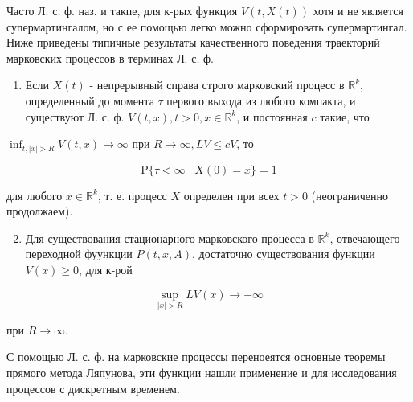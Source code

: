 \documentclass[10pt]{article}
\begin{document}
Часто Л. с. ф. наз. и такпе, для к-рых функция $V(t, X(t))$ хотя и не является супермартингалом, но с ее помощью легко можно сформировать супермартингал. Ниже приведены типичные результаты качественного поведения траекторий марковских процессов в терминах Л. с. ф.



\begin{enumerate}

  \item Если $X(t)$ - непрерывный справа строго марковский процесс в $\mathbb{R}^{k}$, определенный до момента $\tau$ первого выхода из любого компакта, и существуют Л. с. ф. $V(t, x), t>0, x \in \mathbb{R}^{k}$, и постоянная $c$ такие, что

\end{enumerate}



$\inf _{t,|x|>R} V(t, x) \rightarrow \infty$ при $R \longrightarrow \infty, L V \leqslant c V$, то



\[

\mathrm{P}\{\tau<\infty \mid X(0)=x\}=1

\]



для любого $x \in \mathbb{R}^{k}$, т. е. процесс $X$ определен при всех $t>0$ (неограниченно продолжаем).



\begin{enumerate}

  \setcounter{enumi}{1}

  \item Для существования стационарного марковского процесса в $\mathbb{R}^{k}$, отвечающего переходной фуункции $P(t, x, A)$, достаточно существования функции $V(x) \geqslant 0$, для к-рой

\end{enumerate}



\[

\sup _{|x|>R} L V(x) \rightarrow-\infty

\]



при $R \rightarrow \infty$.



С помощью Л. с. ф. на марковские процессы переноеятся основные теоремы прямого метода Ляпунова, эти функции нашли применение и для исследования процессов с дискретным временем.
\end{document}
